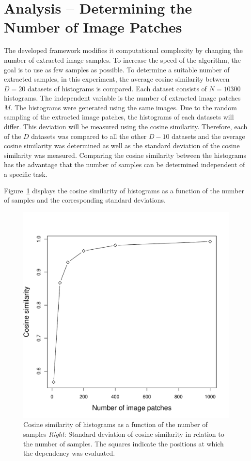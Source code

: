 \documentclass[11pt]{report}
\begin{document}
\section{Analysis -- Determining the Number of Image Patches}
\label{sec:numtextons}

The developed framework modifies it computational complexity by
changing the number of extracted image samples. To increase the speed
of the algorithm, the goal is to use as few samples as possible. To
determine a suitable number of extracted samples, in this experiment,
the average cosine similarity between $D = 20$ datasets of histograms
is compared. Each dataset consists of $N = 10300$ histograms. The
independent variable is the number of extracted image patches $M$. The
histograms were generated using the same images. Due to the random
sampling of the extracted image patches, the histograms of each
datasets will differ. This deviation will be measured using the cosine
similarity. Therefore, each of the $D$ datasets was compared to all
the other $D - 10$ datasets and the average cosine similarity was
determined as well as the standard deviation of the cosine similarity
was measured. Comparing the cosine similarity between the histograms
has the advantage that the number of samples can be determined
independent of a specific task.

Figure~\ref{fig:cosine} displays the cosine similarity of histograms
as a function of the number of samples and the corresponding standard
deviations.

\begin{figure}[h!]
\begin{center}
\includegraphics[width=0.336\columnwidth]{samples_vs_similarity}
\caption{{\label{fig:cosine} Cosine similarity of histograms as a
    function of the number of samples \emph{Right}: Standard deviation
    of cosine similarity in relation to the number of samples. The
    squares indicate the positions at which the dependency was
    evaluated.%
  }}
\end{center}
\end{figure}
\end{document}
